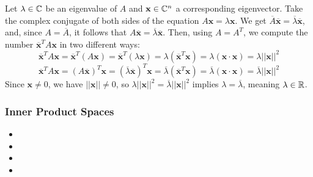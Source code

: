 {Let \(\lambda \in \mathbb{C}\) be an eigenvalue of \(A\) and \(\mathbf{x} \in \mathbb{C}^n\) a corresponding eigenvector. Take the complex conjugate of both sides of the equation \(A\mathbf{x} = \lambda\mathbf{x}\). We get \(\overline{A}\overline{\mathbf{x}} = \overline{\lambda}\overline{\mathbf{x}}\), and, since \(A = \overline{A}\), it follows that \(A\overline{\mathbf{x}} = \overline{\lambda}\overline{\mathbf{x}}\). Then, using \(A=A^T\), we compute the number \(\overline{\mathbf{x}}^TA\mathbf{x}\) in two different ways:
\begin{equation}
    \overline{\mathbf{x}}^TA\mathbf{x} = \overline{\mathbf{x}}^T(A\mathbf{x}) = \overline{\mathbf{x}}^T(\lambda\mathbf{x}) = \lambda(\overline{\mathbf{x}}^T\mathbf{x}) = \lambda(\mathbf{x} \cdot \mathbf{x}) = \lambda||\mathbf{x}||^2
\end{equation}
\begin{equation}
     \overline{\mathbf{x}}^TA\mathbf{x} = (A\overline{\mathbf{x}})^T\mathbf{x} = (\overline{\lambda}\overline{\mathbf{x}})^T\mathbf{x} = \overline{\lambda}(\overline{\mathbf{x}}^T\mathbf{x}) = \overline{\lambda}(\mathbf{x} \cdot \mathbf{x}) = \overline{\lambda}||\mathbf{x}||^2
\end{equation}
Since \(\mathbf{x} \neq 0\), we have \(||\mathbf{x}|| \neq 0\), so \(\lambda||\mathbf{x}||^2 = \overline{\lambda}||\mathbf{x}||^2\) implies \(\lambda = \overline{\lambda}\), meaning \(\lambda \in \mathbb{R}\).
}

\subsubsection{Inner Product Spaces}

\begin{itemize}
    \item {}
    \item {}
    \item {}
    \item {}
\end{itemize}

